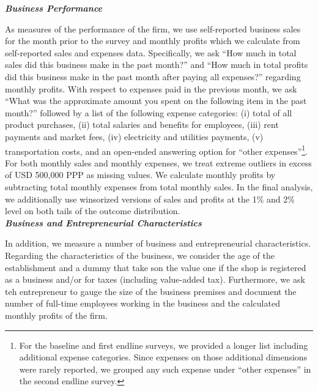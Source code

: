 \documentclass[11.5pt]{article}
\begin{document}
\textbf{\emph{Business Performance}}

As measures of the performance of the firm, we use self-reported business sales for the month prior to the survey and monthly profits which we calculate from self-reported sales and expenses data. Specifically, we ask ``How much in total sales did this business make in the past month?'' and ``How much in total profits did this business make in the past month after paying all expenses?'' regarding monthly profits. With respect to expenses paid in the previous month, we ask ``What was the approximate amount you spent on the following item in the past month?'' followed by a list of the following expense categories: (i) total of all product purchases, (ii) total salaries and benefits for employees, (iii) rent payments and market fees, (iv) electricity and utilities payments, (v) transportation costs, and an open-ended answering option for ``other expenses''\footnote{For the baseline and first endline surveys, we provided a longer list including additional expense categories. Since expenses on those additional dimensions were rarely reported, we grouped any such expense under ``other expenses'' in the second endline survey.}. For both monthly sales and monthly expenses, we treat extreme outliers in excess of USD 500,000 PPP as missing values. We calculate monthly profits by subtracting total monthly expenses from total monthly sales. In the final analysis, we additionally use winsorized versions of sales and profits at the 1\% and 2\% level on both tails of the outcome distribution. \\



\textbf{\emph{Business and Entrepreneurial Characteristics}}

In addition, we measure a number of business and entrepreneurial characteristics. 
Regarding the characteristics of the business, we consider the age of the establishment and a dummy that take son the value one if the shop is registered as a business and/or for taxes (including value-added tax). Furthermore, we ask teh entrepreneur to gauge the size of the business premises and document the number of full-time employees working in the business and the calculated monthly profits of the firm. 
\end{document}
